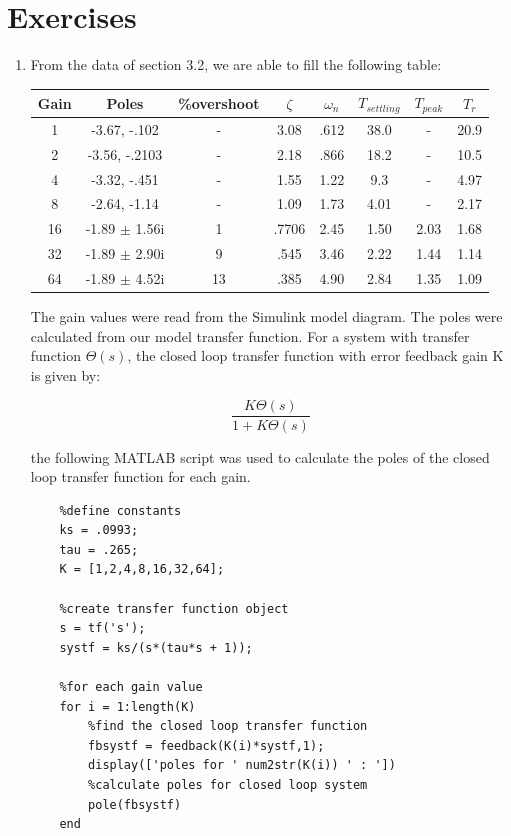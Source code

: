 \documentclass[11pt,a4paper]{article}
\begin{document}
\section{Exercises}
\begin{enumerate}

\item From the data of section 3.2, we are able to fill the following table:


\begin{center}
\begin{tabular}{|c|c|c|c|c|c|c|c|}
\hline
Gain & Poles & \%overshoot & $\zeta$ & $\omega_{n}$ & $T_{settling}$ & $T_{peak}$ & $T_{r}$ \\ \hline
1 & -3.67, -.102 & - & 3.08 & .612 & 38.0 & - & 20.9 \\ \hline 
2 & -3.56, -.2103 & - & 2.18 & .866 & 18.2 & - & 10.5 \\ \hline 
4 & -3.32, -.451 & - & 1.55 & 1.22  & 9.3 & - & 4.97 \\ \hline 
8 & -2.64, -1.14 & - & 1.09 & 1.73  & 4.01 & - & 2.17 \\ \hline 
16 & -1.89 $\pm$ 1.56i & 1 & .7706 & 2.45 & 1.50 & 2.03 & 1.68 \\ \hline 
32 & -1.89 $\pm$ 2.90i & 9 & .545 & 3.46 & 2.22 & 1.44 & 1.14 \\ \hline 
64 & -1.89 $\pm$ 4.52i & 13 & .385 & 4.90 & 2.84 & 1.35 & 1.09 \\ \hline 

\end{tabular}
\end{center}

The gain values were read from the Simulink model diagram. The poles were calculated from our model transfer function. For a system with transfer function $\Theta(s)$, the closed loop transfer function with error feedback gain K is given by:

\begin{equation}
	\frac{K\Theta(s)}{1+K\Theta(s)}
\end{equation}

the following MATLAB script was used to calculate the poles of the closed loop transfer function for each gain.

\begin{verbatim}
	%define constants
	ks = .0993;
	tau = .265;
	K = [1,2,4,8,16,32,64];

	%create transfer function object
	s = tf('s');
	systf = ks/(s*(tau*s + 1));

	%for each gain value
	for i = 1:length(K)
		%find the closed loop transfer function
    	fbsystf = feedback(K(i)*systf,1);
    	display(['poles for ' num2str(K(i)) ' : '])
    	%calculate poles for closed loop system
    	pole(fbsystf)
	end
\end{verbatim}



\end{enumerate}
\end{document}
